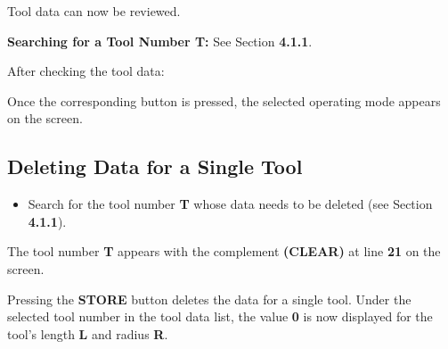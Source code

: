 \begin{itemize}
\end{itemize}

Tool data can now be reviewed.

\textbf{Searching for a Tool Number T:} See Section \textbf{4.1.1}.

After checking the tool data:

\begin{itemize}
\end{itemize}

\vspace{.5cm}

Once the corresponding button is pressed, the selected operating mode appears on the screen.

\subsection{Deleting Data for a Single Tool}

\begin{itemize}
    \vspace{.6cm}
    \item Search for the tool number \textbf{T} whose data needs to be deleted (see Section \textbf{4.1.1}).
    \vspace{.6cm}
\end{itemize}

The tool number \textbf{T} appears with the complement \textbf{(CLEAR)} at line \textbf{21} on the screen.

\begin{itemize}
\end{itemize}

Pressing the \textbf{STORE} button deletes the data for a single tool. Under the selected tool number in the tool data list, the value \textbf{0} is now displayed for the tool’s length \textbf{L} and radius \textbf{R}.


